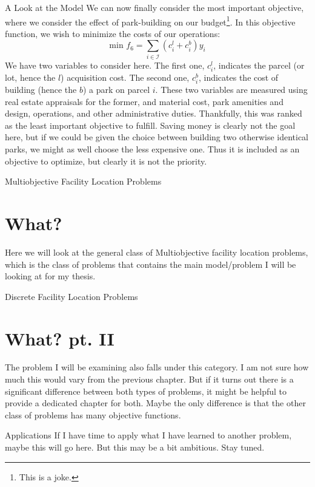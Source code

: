 \documentclass[12pt]{pom_thesis}
\theoremstyle{definition}
\begin{document}
\begin{chapter}{A Look at the Model}
We can now finally consider the most important objective, where we consider the effect of park-building on our budget\footnote{This is a joke.}. In this objective function, we wish to minimize the costs of our operations:
\begin{equation} \label{objective-6}
\textrm{min } f_6 = \sum_{i \in \mathcal{I}} (c_i^l + c_i^b)y_i
\end{equation}
We have two variables to consider here. The first one, $c_i^l$, indicates the parcel (or lot, hence the $l$) acquisition cost. The second one, $c_i^b$, indicates the cost of building (hence the $b$) a park on parcel $i$. These two variables are measured using real estate appraisals for the former, and material cost, park amenities and design, operations, and other administrative duties. Thankfully, this was ranked as the least important objective to fulfill. Saving money is clearly not the goal here, but if we could be given the choice between building two otherwise identical parks, we might as well choose the less expensive one. Thus it is included as an objective to optimize, but clearly it is not the priority.


\end{chapter}

\begin{chapter}{Multiobjective Facility Location Problems}
\section{What?}
Here we will look at the general class of Multiobjective facility location problems, which is the class of problems that contains the main model/problem I will be looking at for my thesis. 
\end{chapter}

\begin{chapter}{Discrete Facility Location Problems}
\section{What? pt. II}
The problem I will be examining also falls under this category. I am not sure how much this would vary from the previous chapter. But if it turns out there is a significant difference between both types of problems, it might be helpful to provide a dedicated chapter for both. Maybe the only difference is that the other class of problems has many objective functions.
\end{chapter}

\begin{chapter}{Applications}
If I have time to apply what I have learned to another problem, maybe this will go here. But this may be a bit ambitious. Stay tuned.
\end{chapter}
\end{document}
